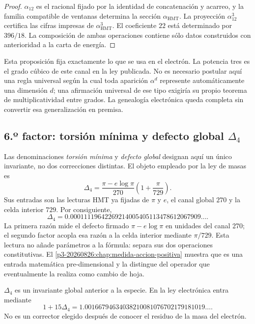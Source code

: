 \begin{proof}
\(\alpha_{12}\) es el racional fijado por la identidad de concatenación y
acarreo, y la familia compatible de ventanas determina la sección
\(\alpha_{\mathrm{HMT}}\). La proyección \(\alpha_{12}^3\) certifica las
cifras impresas de \(\alpha_{\mathrm{HMT}}^3\).
El coeficiente \(22\) está determinado por \(396/18\). La composición de
ambas operaciones contiene sólo datos construidos con anterioridad a la
carta de energía.
\end{proof}

Esta proposición fija exactamente lo que se usa en el electrón. La potencia
tres es el grado cúbico de este canal en la ley publicada. No es necesario
postular aquí una regla universal según la cual toda aparición
\(\alpha^d\) represente automáticamente una dimensión \(d\); una
afirmación universal de ese tipo exigiría su propio teorema de
multiplicatividad entre grados. La genealogía electrónica queda completa
sin convertir esa generalización en premisa.

\subsection{6.º factor: torsión mínima y defecto global \(\Delta_4\)}

Las denominaciones \emph{torsión mínima} y \emph{defecto global}
designan aquí un único invariante, no dos correcciones distintas. El objeto
empleado por la ley de masas es
\begin{equation}
 \label{eq:delta4-electron-rev6}
 \boxed{
 \Delta_4
 =
 \frac{\pi-e\log\pi}{270}
 \left(1+\frac{\pi}{729}\right).}
\end{equation}
Sus entradas son las lecturas HMT ya fijadas de \(\pi\) y \(e\), el canal
global \(270\) y la celda interior \(729\). Por consiguiente,
\[
 \Delta_4
 =
 0.00011119642269214005405113478612067909\ldots.
\]
La primera razón mide el defecto firmado
\(\pi-e\log\pi\) en unidades del canal 270; el segundo factor acopla esa
razón a la celda interior mediante \(\pi/729\). Esta lectura no añade
parámetros a la fórmula: separa sus dos operaciones constitutivas.
El \cref{p3-20260826:chap:medida-accion-positiva} muestra que es una entrada matemática
pre-dimensional y la distingue del operador que eventualmente la realiza
como cambio de hoja.

\begin{proposition}
\label{prop:delta4-global-electron-rev6}
\(\Delta_4\) es un invariante global anterior a la especie. En la ley
electrónica entra mediante
\[
 1+15\Delta_4
 =
 1.00166794634038210081076702179181019\ldots.
\]
No es un corrector elegido después de conocer el residuo de la masa del
electrón.
\end{proposition}

